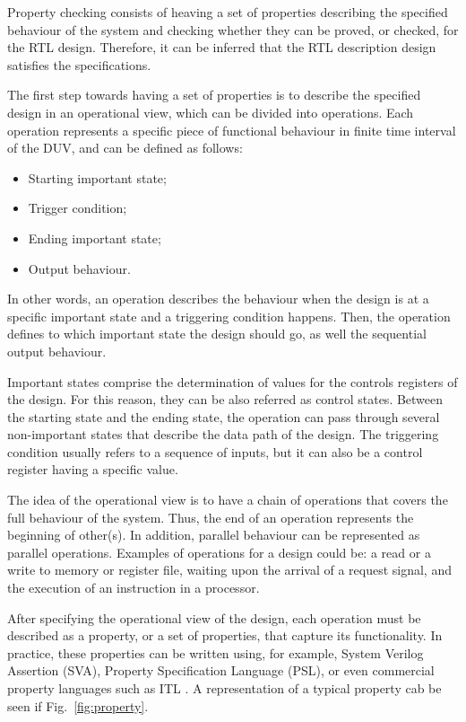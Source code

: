 Property checking consists of heaving a set of properties describing the specified behaviour of the system and checking whether they can be proved, or checked, for the RTL design.  Therefore, it can be inferred that the RTL description design satisfies the specifications. 

The first step towards having a set of properties is to describe the specified design in an operational view, which can be divided into operations. Each operation represents a specific piece of functional behaviour in finite time interval of the DUV, and can be defined as follows:

\begin{itemize}
    \item Starting important state;
    \item Trigger condition;
    \item Ending important state;
    \item Output behaviour.
\end{itemize}

In other words, an operation describes the behaviour when the design is at a specific important state and a triggering condition happens. Then, the operation defines to which important state the design should go, as well the sequential output behaviour. 

Important states comprise the determination of values for the controls registers of the design. For this reason, they can be also referred as control states. Between the starting state and the ending state, the operation can pass through several non-important states that describe the data path of the design. The triggering condition usually refers to a sequence of inputs, but it can also be a control register having a specific value.

The idea of the operational view is to have a chain of operations that covers the full behaviour of the system. Thus, the end of an operation represents the beginning of other(s). In addition, parallel behaviour can be represented as parallel operations. Examples of operations for a design could be: a read or a write to memory or register file, waiting upon the arrival of a request signal, and the execution of an instruction in a processor.

After specifying the operational view of the design, each operation must be described as a property, or a set of properties, that capture its functionality. In practice, these properties can be written using, for example, System Verilog Assertion (SVA), Property Specification Language (PSL), or even commercial property languages such as ITL \cite{onespin}. A representation of a typical property cab be seen if Fig.~\ref{fig:property}.

